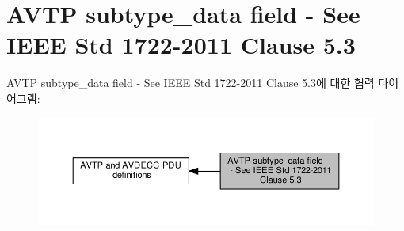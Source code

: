 \hypertarget{group__jdksavdecc__subtype__data}{}\section{A\+V\+TP subtype\+\_\+data field -\/ See I\+E\+EE Std 1722-\/2011 Clause 5.3}
\label{group__jdksavdecc__subtype__data}
A\+V\+TP subtype\+\_\+data field -\/ See I\+E\+EE Std 1722-\/2011 Clause 5.3에 대한 협력 다이어그램\+:
\nopagebreak
\begin{figure}[H]
\begin{center}
\leavevmode
\includegraphics[width=350pt]{group__jdksavdecc__subtype__data}
\end{center}
\end{figure}
